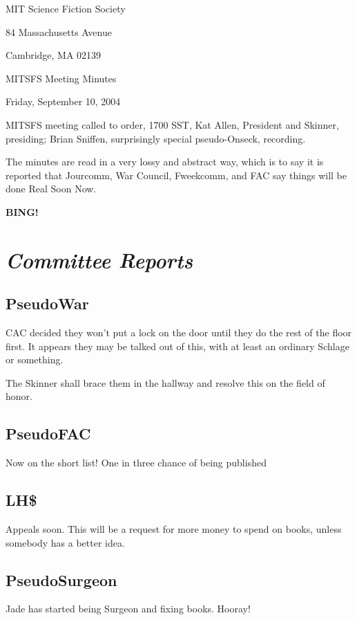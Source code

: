 \documentclass[10pt]{article}
\newcommand{\bing}{{\bf BING!} }
\newcommand{\goto}[1]{\bing \vskip 12pt \section*{{\em{#1}}}}
\begin{document}
\begin{center}

MIT Science Fiction Society 

84 Massachusetts Avenue

Cambridge, MA 02139

\vspace{12pt}

MITSFS Meeting Minutes 

Friday, September 10, 2004

\end{center}
 
\vspace{18pt}

\setlength{\parskip}{6pt}

\noindent
MITSFS meeting called to order, 1700 SST, Kat Allen, President and
Skinner, presiding; Brian Sniffen, surprisingly special pseudo-Onseck, recording.


The minutes are read in a very lossy and abstract way, which is to say
it is reported that Jourcomm, War Council, Fweekcomm, and FAC say
things will be done Real Soon Now.

\goto{Committee Reports}
\subsection*{PseudoWar} CAC decided they won't put a lock on the door until they do
the rest of the floor first.  It appears they may be talked out of
this, with at least an ordinary Schlage or something.

The Skinner shall brace them in the hallway and resolve this on the
field of honor.

\subsection*{PseudoFAC} Now on the short list!  One in three chance of being published

\subsection*{LH\$} Appeals soon.  This will be a request for more money to spend on
books, unless somebody has a better idea.

\subsection*{PseudoSurgeon} Jade has started being Surgeon and fixing books.
Hooray!
\end{document}
